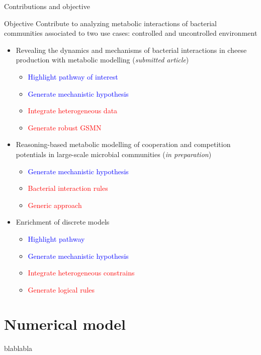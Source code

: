\documentclass[8pt]{beamer}
\begin{document}
\begin{frame}{Contributions and objective}
\begin{block}{Objective}
 Contribute to analyzing metabolic interactions of bacterial communities associated to two use cases: controlled and uncontrolled environment
\end{block}
\begin{itemize}
\item Revealing the dynamics and mechanisms of bacterial interactions in cheese production with metabolic modelling (\textit{submitted article})
\begin{itemize}
\item \textcolor{blue}{Highlight pathway of interest}
\item \textcolor{blue}{Generate mechanistic hypothesis}
\item \textcolor{red}{Integrate heterogeneous data}
\item \textcolor{red}{Generate robust GSMN}
\end{itemize}
\item Reasoning-based metabolic modelling of cooperation and competition potentials in large-scale microbial communities (\textit{in preparation})
\begin{itemize}
\item \textcolor{blue}{Generate mechanistic hypothesis}
\item \textcolor{red}{Bacterial interaction rules}
\item \textcolor{red}{Generic approach}
\end{itemize}
\item Enrichment of discrete models
\begin{itemize}
\item \textcolor{blue}{Highlight pathway}
\item \textcolor{blue}{Generate mechanistic hypothesis}
\item \textcolor{red}{Integrate heterogeneous constrains}
\item \textcolor{red}{Generate logical rules}
\end{itemize}

\end{itemize}

\end{frame}

\section{Numerical model}
\begin{frame}
blablabla
\end{frame}
\tiny
\printbibliography
\end{document}
